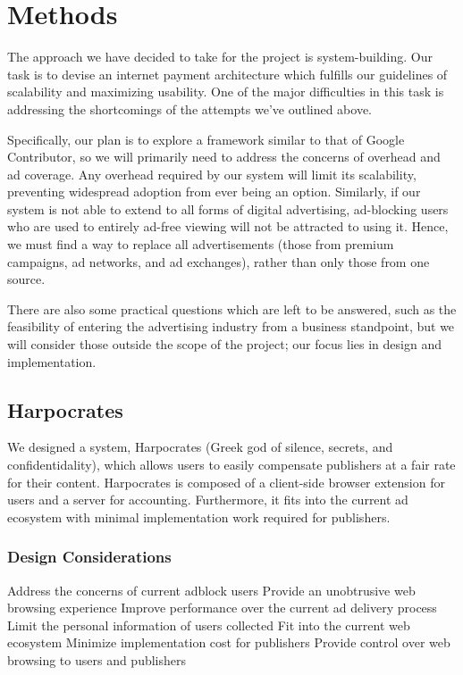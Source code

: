 \section{Methods}
The approach we have decided to take for the project is system-building.
Our task is to devise an internet payment architecture which fulfills our guidelines of scalability and maximizing usability.
One of the major difficulties in this task is addressing the shortcomings of the attempts we've outlined above.

Specifically, our plan is to explore a framework similar to that of Google Contributor, so we will primarily need to address the concerns of overhead and ad coverage.
Any overhead required by our system will limit its scalability, preventing widespread adoption from ever being an option.
Similarly, if our system is not able to extend to all forms of digital advertising, ad-blocking users who are used to entirely ad-free viewing will not be attracted to using it.
Hence, we must find a way to replace all advertisements (those from premium campaigns, ad networks, and ad exchanges), rather than only those from one source.

There are also some practical questions which are left to be answered, such as the feasibility of entering the advertising industry from a business standpoint, but we will consider those outside the scope of the project; our focus lies in design and implementation.

\subsection{Harpocrates}
We designed a system, Harpocrates (Greek god of silence, secrets, and confidentidality), which allows users to easily compensate publishers at a fair rate for their content.
Harpocrates is composed of a client-side browser extension for users and a server for accounting.
Furthermore, it fits into the current ad ecosystem with minimal implementation work required for publishers.

\subsubsection{Design Considerations}
Address the concerns of current adblock users
Provide an unobtrusive web browsing experience
Improve performance over the current ad delivery process
Limit the personal information of users collected
Fit into the current web ecosystem
Minimize implementation cost for publishers
Provide control over web browsing to users and publishers

